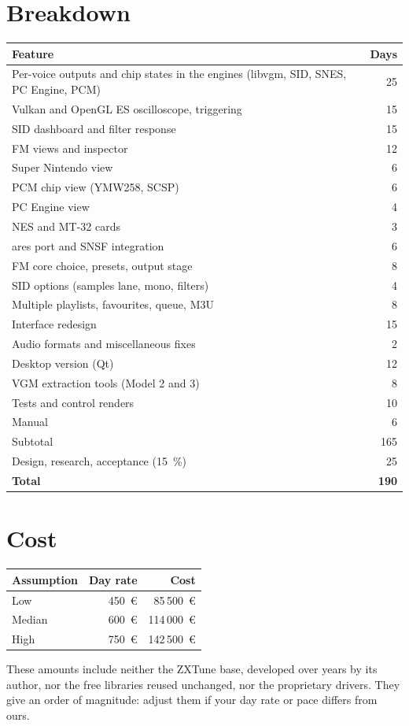 \section{Breakdown}
\begin{longtable}{@{}p{} r@{}}
\toprule \textbf{Feature} & \textbf{Days} \\ \midrule
Per-voice outputs and chip states in the engines (libvgm, SID, SNES, PC Engine, PCM) & 25 \\
Vulkan and OpenGL ES oscilloscope, triggering & 15 \\
SID dashboard and filter response & 15 \\
FM views and inspector & 12 \\
Super Nintendo view & 6 \\
PCM chip view (YMW258, SCSP) & 6 \\
PC Engine view & 4 \\
NES and MT-32 cards & 3 \\
ares port and SNSF integration & 6 \\
FM core choice, presets, output stage & 8 \\
SID options (samples lane, mono, filters) & 4 \\
Multiple playlists, favourites, queue, M3U & 8 \\
Interface redesign & 15 \\
Audio formats and miscellaneous fixes & 2 \\
Desktop version (Qt) & 12 \\
VGM extraction tools (Model 2 and 3) & 8 \\
Tests and control renders & 10 \\
Manual & 6 \\ \midrule
Subtotal & 165 \\
Design, research, acceptance (15~\%) & 25 \\ \midrule
\textbf{Total} & \textbf{190} \\
\bottomrule
\end{longtable}

\section{Cost}
\begin{longtable}{@{}l r r@{}}
\toprule \textbf{Assumption} & \textbf{Day rate} & \textbf{Cost} \\ \midrule
Low & 450~€ & 85\,500~€ \\
Median & 600~€ & 114\,000~€ \\
High & 750~€ & 142\,500~€ \\
\bottomrule
\end{longtable}

These amounts include neither the ZXTune base, developed over years by its author, nor the free libraries reused
unchanged, nor the proprietary drivers. They give an order of magnitude: adjust them if your day rate or pace differs
from ours.
